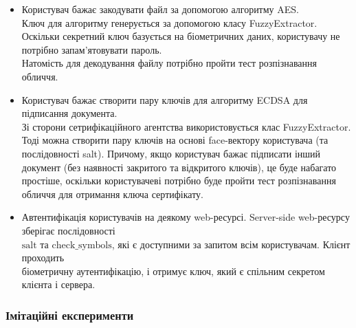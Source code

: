 \documentclass[11pt]{article}
\providecommand{\tightlist}{%
      \setlength{\itemsep}{0pt}\setlength{\parskip}{0pt}}
\begin{document}
\begin{itemize}
\tightlist
\item
  Користувач бажає закодувати файл за допомогою алгоритму AES.\\
  Ключ для алгоритму генерується за допомогою класу FuzzyExtractor.
  Оскільки секретний ключ базується на біометричних даних, користувачу
  не потрібно запам'ятовувати пароль.\\
  Натомість для декодування файлу потрібно пройти тест розпізнавання
  обличчя.
\item
  Користувач бажає створити пару ключів для алгоритму ECDSA для
  підписання документа.\\
  Зі сторони сетрифікаційного агентства використовується клас
  FuzzyExtractor.\\
  Тоді можна створити пару ключів на основі face-вектору користувача (та
  послідовності salt). Причому, якщо користувач бажає підписати інший
  документ (без наявності закритого та відкритого ключів), це буде
  набагато простіше, оскільки користувачеві потрібно буде пройти тест
  розпізнавання обличчя для отримання ключа сертифікату.
\item
  Автентифікація користувачів на деякому web-ресурсі. Server-side
  web-ресурсу зберігає послідовності\\
  \(\text{salt}\) та \(\text{check_symbols}\), які є доступними за
  запитом всім користувачам. Клієнт проходить\\
  біометричну аутентифікацію, і отримує ключ, який є спільним секретом
  клієнта і сервера.
\end{itemize}

    \hypertarget{ux456ux43cux456ux442ux430ux446ux456ux439ux43dux456-ux435ux43aux441ux43fux435ux440ux438ux43cux435ux43dux442ux438}{%
\subsubsection{Імітаційні
експерименти}\label{ux456ux43cux456ux442ux430ux446ux456ux439ux43dux456-ux435ux43aux441ux43fux435ux440ux438ux43cux435ux43dux442ux438}}
\end{document}
